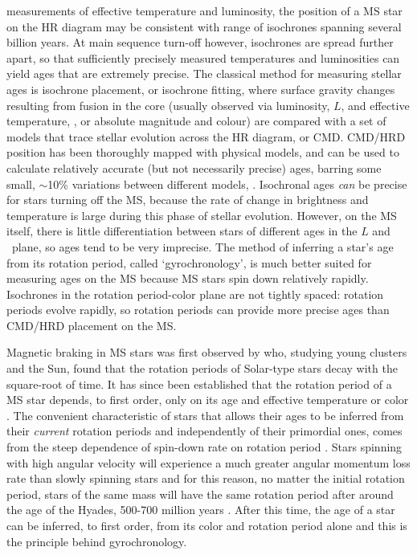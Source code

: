 measurements of effective temperature and luminosity, the position of a MS
star on the HR diagram may be consistent with range of isochrones spanning
several billion years.
At main sequence turn-off however, isochrones are spread further apart, so
that sufficiently precisely measured temperatures and luminosities can yield
ages that are extremely precise.
The classical method for measuring stellar ages is isochrone placement, or
isochrone fitting, where surface gravity changes resulting from fusion in the
core (usually observed via luminosity, $L$, and effective temperature, \teff,
or absolute magnitude and colour) are compared with a set of models that trace
stellar evolution across the HR diagram, or CMD.
CMD/HRD position has been thoroughly mapped with physical models, and can be
used to calculate relatively accurate (but not necessarily precise) ages,
barring some small, $\sim$10\% variations between different models,
\citep[\eg][]{yi2001, dotter2008, dotter2016}.
Isochronal ages {\it can} be precise for stars turning off the MS, because the
rate of change in brightness and temperature is large during this phase of
stellar evolution.
However, on the MS itself, there is little differentiation between stars of
different ages in the $L$ and \teff\ plane, so ages tend to be very imprecise.
The method of inferring a star's age from its rotation period, called
`gyrochronology', is much better suited for measuring ages on the MS because
MS stars spin down relatively rapidly.
Isochrones in the rotation period-color plane are not tightly spaced: rotation
periods evolve rapidly, so rotation periods can provide more precise ages than
CMD/HRD placement on the MS.

Magnetic braking in MS stars was first observed by \citet{skumanich1972} who,
studying young clusters and the Sun, found that the rotation periods of
Solar-type stars decay with the square-root of time.
It has since been established that the rotation period of a MS star depends,
to first order, only on its age and effective temperature or color
\citep[\eg][]{barnes2003}.
The convenient characteristic of stars that allows their ages to be inferred
from their {\it current} rotation periods and independently of their
primordial ones, comes from the steep dependence of spin-down rate on rotation
period \citep{kawaler1989}.
Stars spinning with high angular velocity will experience a much greater
angular momentum loss rate than slowly spinning stars and for this reason, no
matter the initial rotation period, stars of the same mass will have the same
rotation period after around the age of the Hyades, 500-700 million years
\citep{irwin2009}.
After this time, the age of a star can be inferred, to first order, from its
color and rotation period alone and this is the principle behind
gyrochronology.

